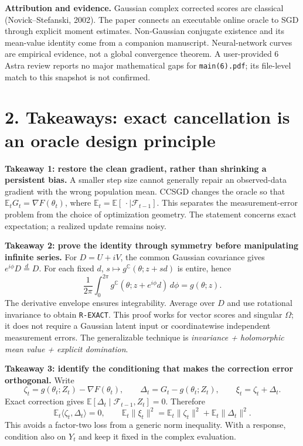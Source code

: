 \documentclass[11pt]{article}
\newcommand{\E}{\mathbb E}\newcommand{\R}{\mathbb R}\newcommand{\C}{\mathbb C}
\newcommand{\norm}[1]{\lVert#1\rVert}
\newcommand{\ID}[1]{\texttt{#1}}
\begin{document}
\textbf{Attribution and evidence.} Gaussian complex corrected scores are classical (Novick--Stefanski, 2002). The paper connects an executable online oracle to SGD through explicit moment estimates. Non-Gaussian conjugate existence and its mean-value identity come from a companion manuscript. Neural-network curves are empirical evidence, not a global convergence theorem. A user-provided 6 Astra review reports no major mathematical gaps for \texttt{main(6).pdf}; its file-level match to this snapshot is not confirmed.

\clearpage
\section*{2. Takeaways: exact cancellation is an oracle design principle}
\textbf{Takeaway 1: restore the clean gradient, rather than shrinking a persistent bias.}
A smaller step size cannot generally repair an observed-data gradient with the wrong population mean. CCSGD changes the oracle so that
$\E_tG_t=\nabla F(\theta_t)$, where $\E_t=\E[\,\cdot\mid\mathcal F_{t-1}]$.
This separates the measurement-error problem from the choice of optimization geometry.
The statement concerns exact expectation; a realized update remains noisy.

\textbf{Takeaway 2: prove the identity through symmetry before manipulating infinite series.}
For $D=U+iV$, the common Gaussian covariance gives $e^{i\phi}D\overset d=D$.
For each fixed $d$, $s\mapsto g^{\C}(\theta;z+sd)$ is entire, hence
\[
\frac1{2\pi}\int_0^{2\pi}g^{\C}(\theta;z+e^{i\phi}d)\,d\phi=g(\theta;z).
\]
The derivative envelope ensures integrability. Average over $D$ and use rotational invariance to obtain \ID{R-EXACT}. This proof works for vector scores and singular $\Omega$; it does not require a Gaussian latent input or coordinatewise independent measurement errors. The generalizable technique is \emph{invariance + holomorphic mean value + explicit domination}.

\textbf{Takeaway 3: identify the conditioning that makes the correction error orthogonal.}
Write
\[
\zeta_t=g(\theta_t;Z_t)-\nabla F(\theta_t),\qquad
\Delta_t=G_t-g(\theta_t;Z_t),\qquad \xi_t=\zeta_t+\Delta_t.
\]
Exact correction gives $\E[\Delta_t\mid\mathcal F_{t-1},Z_t]=0$. Therefore
\[
\E_t\langle\zeta_t,\Delta_t\rangle=0,\qquad
\E_t\norm{\xi_t}^2=\E_t\norm{\zeta_t}^2+\E_t\norm{\Delta_t}^2.
\]
This avoids a factor-two loss from a generic norm inequality. With a response, condition also on $Y_t$ and keep it fixed in the complex evaluation.
\end{document}
